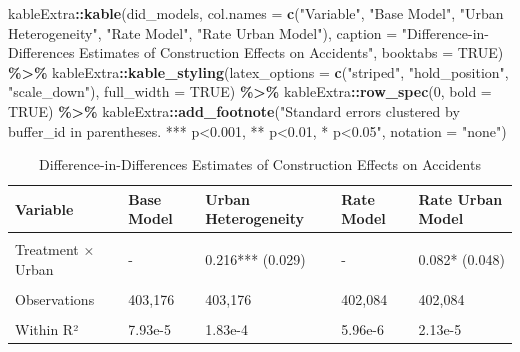 \documentclass[
]{article}
\newenvironment{Shaded}{\begin{snugshade}}{\end{snugshade}}
\newcommand{\AttributeTok}[1]{\textcolor[rgb]{0.13,0.29,0.53}{#1}}
\newcommand{\ConstantTok}[1]{\textcolor[rgb]{0.56,0.35,0.01}{#1}}
\newcommand{\DecValTok}[1]{\textcolor[rgb]{0.00,0.00,0.81}{#1}}
\newcommand{\FunctionTok}[1]{\textcolor[rgb]{0.13,0.29,0.53}{\textbf{#1}}}
\newcommand{\NormalTok}[1]{#1}
\newcommand{\SpecialCharTok}[1]{\textcolor[rgb]{0.81,0.36,0.00}{\textbf{#1}}}
\newcommand{\StringTok}[1]{\textcolor[rgb]{0.31,0.60,0.02}{#1}}
\begin{document}
\begin{Shaded}
\begin{Highlighting}[]
\NormalTok{kableExtra}\SpecialCharTok{::}\FunctionTok{kable}\NormalTok{(did\_models, }
                 \AttributeTok{col.names =} \FunctionTok{c}\NormalTok{(}\StringTok{"Variable"}\NormalTok{, }\StringTok{"Base Model"}\NormalTok{, }\StringTok{"Urban Heterogeneity"}\NormalTok{, }\StringTok{"Rate Model"}\NormalTok{, }\StringTok{"Rate Urban Model"}\NormalTok{),}
                 \AttributeTok{caption =} \StringTok{"Difference{-}in{-}Differences Estimates of Construction Effects on Accidents"}\NormalTok{,}
                 \AttributeTok{booktabs =} \ConstantTok{TRUE}\NormalTok{) }\SpecialCharTok{\%\textgreater{}\%}
\NormalTok{  kableExtra}\SpecialCharTok{::}\FunctionTok{kable\_styling}\NormalTok{(}\AttributeTok{latex\_options =} \FunctionTok{c}\NormalTok{(}\StringTok{"striped"}\NormalTok{, }\StringTok{"hold\_position"}\NormalTok{, }\StringTok{"scale\_down"}\NormalTok{),}
                           \AttributeTok{full\_width =} \ConstantTok{TRUE}\NormalTok{) }\SpecialCharTok{\%\textgreater{}\%}
\NormalTok{  kableExtra}\SpecialCharTok{::}\FunctionTok{row\_spec}\NormalTok{(}\DecValTok{0}\NormalTok{, }\AttributeTok{bold =} \ConstantTok{TRUE}\NormalTok{) }\SpecialCharTok{\%\textgreater{}\%}
\NormalTok{  kableExtra}\SpecialCharTok{::}\FunctionTok{add\_footnote}\NormalTok{(}\StringTok{"Standard errors clustered by buffer\_id in parentheses. *** p\textless{}0.001, ** p\textless{}0.01, * p\textless{}0.05"}\NormalTok{, }
                          \AttributeTok{notation =} \StringTok{"none"}\NormalTok{)}
\end{Highlighting}
\end{Shaded}

\begin{longtabu} to 
\caption{\label{tab:did_models_table}Difference-in-Differences Estimates of Construction Effects on Accidents}\\
\toprule
\textbf{Variable} & \textbf{Base Model} & \textbf{Urban Heterogeneity} & \textbf{Rate Model} & \textbf{Rate Urban Model}\\
\midrule
{} &  &  &  & \\
Treatment × Urban & - & 0.216*** (0.029) & - & 0.082* (0.048)\\
 &  &  &  & \\
Observations & 403,176 & 403,176 & 402,084 & 402,084\\
 &  &  &  & \\
\addlinespace
Within R² & 7.93e-5 & 1.83e-4 & 5.96e-6 & 2.13e-5\\
\bottomrule
\end{longtabu}
\end{document}
